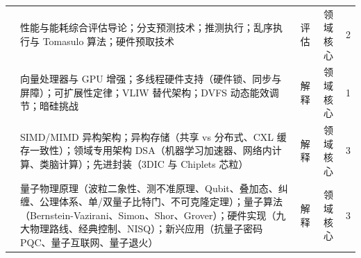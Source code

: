 \begin{tabularx}{\textwidth}{p{} Y c c c}
& 性能与能耗综合评估导论；分支预测技术；推测执行；乱序执行与 Tomasulo 算法；硬件预取技术 & 评估 & 领域核心 & 2 \\
& 向量处理器与 GPU 增强；多线程硬件支持（硬件锁、同步与屏障）；可扩展性定律；VLIW 替代架构；DVFS 动态能效调节；暗硅挑战 & 解释 & 领域核心 & 1 \\
\midrule
{} 
& SIMD/MIMD 异构架构；异构存储（共享 vs 分布式、CXL 缓存一致性）；领域专用架构 DSA（机器学习加速器、网络内计算、类脑计算）；先进封装（3DIC 与 Chiplets 芯粒） & 解释 & 领域核心 & 3 \\
\midrule
{} 
& 量子物理原理（波粒二象性、测不准原理、Qubit、叠加态、纠缠、公理体系、单/双量子比特门、不可克隆定理）；量子算法（Bernstein-Vazirani、Simon、Shor、Grover）；硬件实现（九大物理路线、经典控制、NISQ）；新兴应用（抗量子密码 PQC、量子互联网、量子退火） & 解释 & 领域核心 & 3 \\
\bottomrule
\end{tabularx}
\clearpage
\twocolumn
